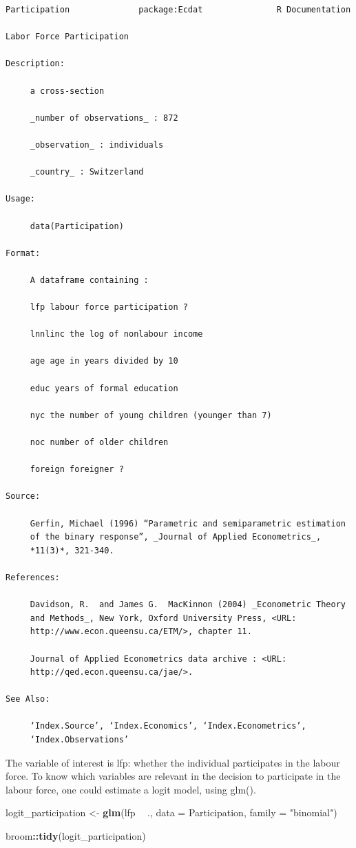 \documentclass[]{gitbook}
\newenvironment{Shaded}{\begin{snugshade}}{\end{snugshade}}
\newcommand{\DataTypeTok}[1]{\textcolor[rgb]{0.13,0.29,0.53}{#1}}
\newcommand{\KeywordTok}[1]{\textcolor[rgb]{0.13,0.29,0.53}{\textbf{#1}}}
\newcommand{\NormalTok}[1]{#1}
\newcommand{\OperatorTok}[1]{\textcolor[rgb]{0.81,0.36,0.00}{\textbf{#1}}}
\newcommand{\StringTok}[1]{\textcolor[rgb]{0.31,0.60,0.02}{#1}}
\theoremstyle{definition}
\theoremstyle{definition}
\theoremstyle{definition}
\theoremstyle{remark}
\begin{document}
\begin{verbatim}
Participation              package:Ecdat               R Documentation

Labor Force Participation

Description:

     a cross-section

     _number of observations_ : 872

     _observation_ : individuals

     _country_ : Switzerland

Usage:

     data(Participation)

Format:

     A dataframe containing :

     lfp labour force participation ?

     lnnlinc the log of nonlabour income

     age age in years divided by 10

     educ years of formal education

     nyc the number of young children (younger than 7)

     noc number of older children

     foreign foreigner ?

Source:

     Gerfin, Michael (1996) “Parametric and semiparametric estimation
     of the binary response”, _Journal of Applied Econometrics_,
     *11(3)*, 321-340.

References:

     Davidson, R.  and James G.  MacKinnon (2004) _Econometric Theory
     and Methods_, New York, Oxford University Press, <URL:
     http://www.econ.queensu.ca/ETM/>, chapter 11.

     Journal of Applied Econometrics data archive : <URL:
     http://qed.econ.queensu.ca/jae/>.

See Also:

     ‘Index.Source’, ‘Index.Economics’, ‘Index.Econometrics’,
     ‘Index.Observations’
\end{verbatim}

The variable of interest is lfp: whether the individual participates in
the labour force. To know which variables are relevant in the decision
to participate in the labour force, one could estimate a logit model,
using glm().

\begin{Shaded}
\begin{Highlighting}[]
\NormalTok{logit_participation <-}\StringTok{ }\KeywordTok{glm}\NormalTok{(lfp }\OperatorTok{~}\StringTok{ }\NormalTok{., }\DataTypeTok{data =}\NormalTok{ Participation, }\DataTypeTok{family =} \StringTok{"binomial"}\NormalTok{)}

\NormalTok{broom}\OperatorTok{::}\KeywordTok{tidy}\NormalTok{(logit_participation)}
\end{Highlighting}
\end{Shaded}
\end{document}
